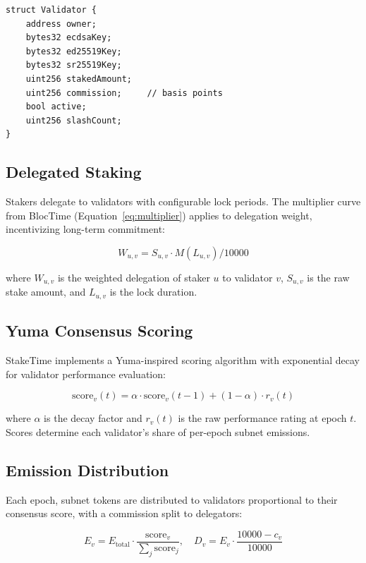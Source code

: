 \documentclass[11pt,a4paper]{article}
\begin{document}
\begin{lstlisting}[style=solidity]
struct Validator {
    address owner;
    bytes32 ecdsaKey;
    bytes32 ed25519Key;
    bytes32 sr25519Key;
    uint256 stakedAmount;
    uint256 commission;     // basis points
    bool active;
    uint256 slashCount;
}
\end{lstlisting}

\subsection{Delegated Staking}

Stakers delegate to validators with configurable lock periods. The multiplier curve from BlocTime (Equation~\ref{eq:multiplier}) applies to delegation weight, incentivizing long-term commitment:

\begin{equation}
W_{u,v} = S_{u,v} \cdot M(L_{u,v}) / 10000
\label{eq:delegation}
\end{equation}

where $W_{u,v}$ is the weighted delegation of staker $u$ to validator $v$, $S_{u,v}$ is the raw stake amount, and $L_{u,v}$ is the lock duration.

\subsection{Yuma Consensus Scoring}

StakeTime implements a Yuma-inspired scoring algorithm with exponential decay for validator performance evaluation:

\begin{equation}
\text{score}_v(t) = \alpha \cdot \text{score}_v(t-1) + (1 - \alpha) \cdot r_v(t)
\label{eq:yuma}
\end{equation}

where $\alpha$ is the decay factor and $r_v(t)$ is the raw performance rating at epoch $t$. Scores determine each validator's share of per-epoch subnet emissions.

\subsection{Emission Distribution}

Each epoch, subnet tokens are distributed to validators proportional to their consensus score, with a commission split to delegators:

\begin{equation}
E_v = E_{\text{total}} \cdot \frac{\text{score}_v}{\sum_j \text{score}_j}, \quad
D_v = E_v \cdot \frac{10000 - c_v}{10000}
\label{eq:emission}
\end{equation}
\end{document}
